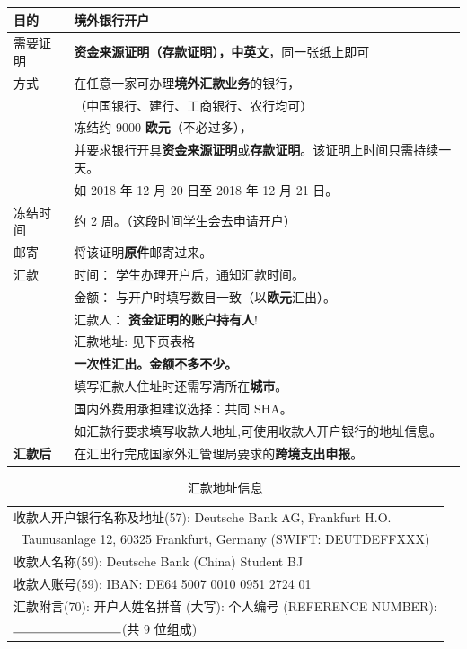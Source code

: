 \documentclass[final]{book}
\begin{document}
\begin{appendices}
\begin{center}
\begin{tabular}{ll}
  \toprule
  目的 & 境外银行\textbf{开户} \\ \midrule
  需要证明 & \textbf{资金来源证明（存款证明），\color{blue}中英文}，同一张纸上即可 \\ \midrule
  方式 & 在任意一家可办理\textbf{\color{blue}境外汇款业务}的银行，\\
  & （中国银行、建行、工商银行、农行均可） \\
  & 冻结约 9000 \textbf{\color{blue}欧元}（不必过多）， \\
  & 并要求银行开具\textbf{资金来源证明}或\textbf{存款证明}。该证明上时间只需持续一天。 \\
  & 如 2018 年 12 月 20 日至 2018 年 12 月 21 日。 \\
  冻结时间 & 约 2 周。（这段时间学生会去申请开户） \\ \midrule
  邮寄 & 将该证明\textbf{原件}邮寄过来。 \\ \midrule
  汇款 & {\color{blue}时间}： 学生办理开户后，通知汇款时间。 \\
  & {\color{blue}金额}： 与开户时填写数目一致（以\textbf{\color{blue}欧元}汇出）。 \\
  & {\color{blue}汇款人}： \textbf{资金证明的账户\color{blue}持有人}! \\
  & {\color{blue}汇款地址}: 见下页表格 \\
  & \textbf{一次性汇出。金额不多不少。} \\
  & 填写汇款人住址时还需写清所在\textbf{城市}。 \\
  & 国内外费用承担建议选择：共同 SHA。 \\
  & 如汇款行要求填写收款人地址,可使用收款人开户银行的地址信息。 \\ \midrule
  \textbf{汇款后} & 在汇出行完成国家外汇管理局要求的\textbf{跨境支出申报}。 \\  
  \bottomrule
\end{tabular}
\end{center}


\begin{table}
\caption{汇款地址信息}
\label{tb:address}
\begin{center}
\begin{tabular}{l}
\toprule
收款人开户银行名称及地址(57): Deutsche Bank AG, Frankfurt H.O. \\
\multicolumn{1}{c}{Taunusanlage 12, 60325 Frankfurt, Germany
 (SWIFT: DEUTDEFFXXX)} \\
收款人名称(59): Deutsche Bank (China) Student BJ \\
收款人账号(59): IBAN: DE64 5007 0010 0951 2724 01 \\
汇款附言(70): 开户人姓名拼音 (大写): \underline{\hspace*{3cm}} 个人编号 (REFERENCE NUMBER):\\
 $\rule{3cm}{0.15mm}$(共 9 位组成) \\ \bottomrule
\end{tabular}
\end{center}
\end{table}


\end{appendices}
\end{document}
